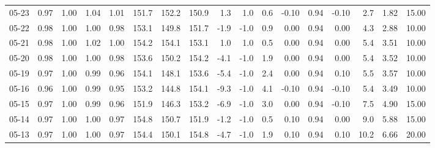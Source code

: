 \begin{threeparttable}
{\begin{tabular}{lrrrrrrrrrrrrrrrr}
  05-23 &         0.97 &           1.00 &          1.04 &          1.01 & 151.7 & 152.2 & 150.9 &        1.3 &                      1.0 &                 0.6 &      -0.10 &      0.94 &          -0.10 &              2.7 &            1.82 &                  15.00 \\
  05-22 &         0.98 &           1.00 &          1.00 &          0.98 & 153.1 & 149.8 & 151.7 &       -1.9 &                     -1.0 &                 0.9 &       0.00 &      0.94 &           0.00 &              4.3 &            2.88 &                  10.00 \\
  05-21 &         0.98 &           1.00 &          1.02 &          1.00 & 154.2 & 154.1 & 153.1 &        1.0 &                      1.0 &                 0.5 &       0.00 &      0.94 &           0.00 &              5.4 &            3.51 &                  10.00 \\
  05-20 &         0.98 &           1.00 &          1.00 &          0.98 & 153.6 & 150.2 & 154.2 &       -4.1 &                     -1.0 &                 1.9 &       0.00 &      0.94 &           0.00 &              5.4 &            3.52 &                  10.00 \\
  05-19 &         0.97 &           1.00 &          0.99 &          0.96 & 154.1 & 148.1 & 153.6 &       -5.4 &                     -1.0 &                 2.4 &       0.00 &      0.94 &           0.10 &              5.5 &            3.57 &                  10.00 \\
  05-16 &         0.96 &           1.00 &          0.99 &          0.95 & 153.2 & 144.8 & 154.1 &       -9.3 &                     -1.0 &                 4.1 &      -0.10 &      0.94 &          -0.10 &              5.4 &            3.49 &                  10.00 \\
  05-15 &         0.97 &           1.00 &          0.99 &          0.96 & 151.9 & 146.3 & 153.2 &       -6.9 &                     -1.0 &                 3.0 &       0.00 &      0.94 &          -0.10 &              7.5 &            4.90 &                  15.00 \\
  05-14 &         0.97 &           1.00 &          1.00 &          0.97 & 154.8 & 150.7 & 151.9 &       -1.2 &                     -1.0 &                 0.5 &       0.10 &      0.94 &           0.00 &              9.0 &            5.88 &                  15.00 \\
  05-13 &         0.97 &           1.00 &          1.00 &          0.97 & 154.4 & 150.1 & 154.8 &       -4.7 &                     -1.0 &                 1.9 &       0.10 &      0.94 &           0.10 &             10.2 &            6.66 &                  20.00 \\

\end{tabular}}
\end{threeparttable}

